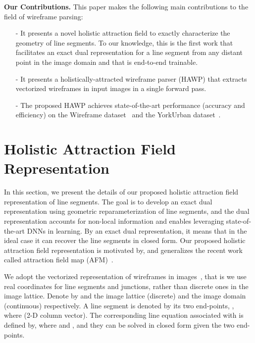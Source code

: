 \documentclass[10pt,twocolumn,letterpaper]{article}
\newcommand{\compresslist}{\setlength{\itemsep}{0pt}\setlength{\parskip}{0pt}\setlength{\parsep}{0pt}}
\begin{document}
\textbf{Our Contributions.}
This paper makes the following main contributions to the field of wireframe parsing:
\begin{enumerate}\compresslist
    \item[-] It presents a novel holistic attraction field to exactly characterize the geometry of line segments. To our knowledge, this is the first work that facilitates an exact dual representation for a line segment from any distant point in the image domain and that is end-to-end trainable.
    
    \item[-] It presents a holistically-attracted wireframe parser (HAWP) that extracts vectorized wireframes in input images in a single forward pass. 
    
    \item[-] The proposed HAWP achieves state-of-the-art performance (accuracy and efficiency) on the Wireframe dataset~\cite{Huang2018a} and the YorkUrban dataset~\cite{Denis2008}. 
\end{enumerate}
\section{Holistic Attraction Field Representation}\label{sec:HAFM}
\vspace{-2mm}
In this section, we present the details of our proposed holistic attraction field  representation of line segments. The goal is to develop an exact dual representation using geometric reparameterization of line segments, and the dual representation accounts for non-local information and enables leveraging state-of-the-art DNNs in learning. By an exact dual representation, it means that in the ideal case it can recover the line segments in closed form. Our proposed holistic attraction field representation is motivated by, and generalizes the recent work called attraction field map (AFM)~\cite{afm}. 

We adopt the vectorized representation of wireframes in images~\cite{Huang2018a}, that is we use real coordinates for line segments and junctions, rather than discrete ones in the image lattice. Denote by  and  the image lattice (discrete) and the image domain (continuous) respectively.  A line segment is denoted by its two end-points, , where  (2-D column vector). The corresponding line equation associated with  is defined by,   where  and , and they can be solved in closed form given the two end-points.  
\end{document}
